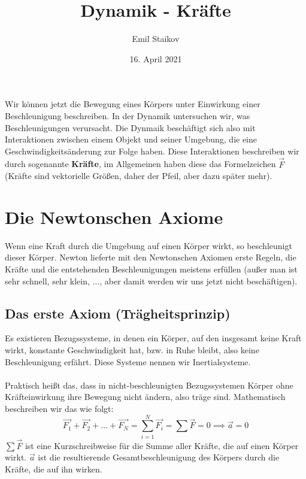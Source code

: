 \documentclass[11pt]{article}
\title{Dynamik - Kräfte}
\author{Emil Staikov}
\date{16. April 2021}
\begin{document}
\maketitle
Wir können jetzt die Bewegung eines Körpers unter Einwirkung einer Beschleunigung beschreiben. In der Dynamik untersuchen wir, was Beschleunigungen verursacht. Die Dynmaik beschäftigt sich also mit Interaktionen zwischen einem Objekt und seiner Umgebung, die eine Geschwindigkeitsänderung zur Folge haben. Diese Interaktionen beschreiben wir durch sogenannte \textbf{Kräfte}, im Allgemeinen haben diese das Formelzeichen $\vec{F}$ (Kräfte sind vektorielle Größen, daher der Pfeil, aber dazu später mehr). 

\section{Die Newtonschen Axiome}
Wenn eine Kraft durch die Umgebung auf einen Körper wirkt, so beschleunigt dieser Körper. Newton lieferte mit den Newtonschen Axiomen erste Regeln, die Kräfte und die entstehenden Beschleunigungen meistens erfüllen (außer man ist sehr schnell, sehr klein, ..., aber damit werden wir uns jetzt nicht beschäftigen). 

\subsection{Das erste Axiom (Trägheitsprinzip)}
Es existieren Bezugssysteme, in denen ein Körper, auf den insgesamt keine Kraft wirkt, konstante Geschwindigkeit hat, bzw. in Ruhe bleibt, also keine Beschleunigung erfährt. Diese Systeme nennen wir Inertialsysteme. \\\\
Praktisch heißt das, dass in nicht-beschleunigten Bezugssystemen Körper ohne Kräfteinwirkung ihre Bewegung nicht ändern, also träge sind. Mathematisch beschreiben wir das wie folgt: 
\begin{equation*}
    \vec{F_1} + \vec{F_2} + ... + \vec{F_N} = \sum_{i=1}^N \vec{F_i} = \sum \vec{F} = 0 \implies \vec{a} = 0
\end{equation*}
$\displaystyle \sum \vec{F}$ ist eine Kurzschreibweise für die Summe aller Kräfte, die auf einen Körper wirkt. $\vec{a}$ ist die resultierende Gesamtbeschleunigung des Körpers durch die Kräfte, die auf ihn wirken. 
\end{document}
